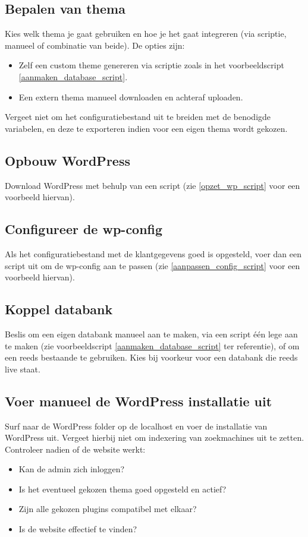 \subsection{Bepalen van thema}
Kies welk thema je gaat gebruiken en hoe je het gaat integreren (via scriptie, manueel of combinatie van beide). De opties zijn:
\begin{itemize}
    \item Zelf een custom theme genereren via scriptie zoals in het voorbeeldscript \ref{aanmaken_database_script}.
    \item Een extern thema manueel downloaden en achteraf uploaden.
\end{itemize}
Vergeet niet om het configuratiebestand uit te breiden met de benodigde variabelen, en deze te exporteren indien voor een eigen thema wordt gekozen.
\subsection{Opbouw WordPress}
Download WordPress met behulp van een script (zie \ref{opzet_wp_script} voor een voorbeeld hiervan).
\subsection{Configureer de wp-config}
Als het configuratiebestand met de klantgegevens goed is opgesteld, voer dan een script uit om de wp-config aan te passen (zie \ref{aanpassen_config_script} voor een voorbeeld hiervan).
\subsection{Koppel databank}
Beslis om een eigen databank manueel aan te maken, via een script één lege aan te maken (zie voorbeeldscript \ref{aanmaken_database_script} ter referentie), of om een reeds bestaande te gebruiken. Kies bij voorkeur voor een databank die reeds live staat.
\subsection{Voer manueel de WordPress installatie uit}
Surf naar de WordPress folder op de localhost en voer de installatie van WordPress uit. Vergeet hierbij niet om indexering van zoekmachines uit te zetten. Controleer nadien of de website werkt:
\begin{itemize}
    \item Kan de admin zich inloggen?
    \item Is het eventueel gekozen thema goed opgesteld en actief?
    \item Zijn alle gekozen plugins compatibel met elkaar?
    \item Is de website effectief te vinden?
\end{itemize}
